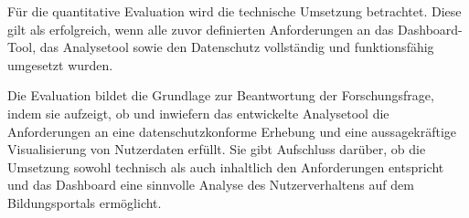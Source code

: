 Für die quantitative Evaluation wird die technische Umsetzung betrachtet. Diese gilt als erfolgreich, wenn alle zuvor definierten Anforderungen an das Dashboard-Tool, das Analysetool sowie den Datenschutz vollständig und funktionsfähig umgesetzt wurden.

Die Evaluation bildet die Grundlage zur Beantwortung der Forschungsfrage, indem sie aufzeigt, ob und inwiefern das entwickelte Analysetool die Anforderungen an eine datenschutzkonforme Erhebung und eine aussagekräftige Visualisierung von Nutzerdaten erfüllt. Sie gibt Aufschluss darüber, ob die Umsetzung sowohl technisch als auch inhaltlich den Anforderungen entspricht und das Dashboard eine sinnvolle Analyse des Nutzerverhaltens auf dem Bildungsportals ermöglicht.
